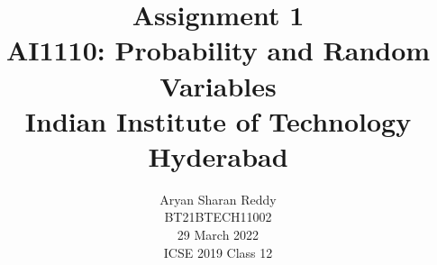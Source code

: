 \documentclass[journal,12pt,twocolumn]{IEEEtran}
\title{Assignment 1 \\ \Large AI1110: Probability and Random Variables \\ \large Indian Institute of Technology Hyderabad}
\author{Aryan Sharan Reddy \\ \normalsize BT21BTECH11002 \\ \vspace*{20pt} \normalsize  29 March 2022 \\ \vspace*{20pt} \Large ICSE 2019 Class 12}
\begin{document}
%


\newtheorem{theorem}{Theorem}[section]
\newtheorem{problem}{Problem}
\newtheorem{proposition}{Proposition}[section]
\newtheorem{lemma}{Lemma}[section]
\newtheorem{corollary}[theorem]{Corollary}
\newtheorem{example}{Example}[section]
\newtheorem{definition}[problem]{Definition}
\newcommand{\BEQA}{\begin{eqnarray}}
\newcommand{\EEQA}{\end{eqnarray}}
\newcommand{\define}{\stackrel{\triangle}{=}}
\newcommand*\circled[1]{\tikz[baseline=(char.base)]{
    \node[shape=circle,draw,inner sep=2pt] (char) {#1};}}

%
\providecommand{\mbf}{\mathbf}
\providecommand{\pr}[1]{\ensuremath{\Pr\left(#1\right)}}
\providecommand{\qfunc}[1]{\ensuremath{Q\left(#1\right)}}
\providecommand{\sbrak}[1]{\ensuremath{{}\left[#1\right]}}
\providecommand{\lsbrak}[1]{\ensuremath{{}\left[#1\right.}}
\providecommand{\rsbrak}[1]{\ensuremath{{}\left.#1\right]}}
\providecommand{\brak}[1]{\ensuremath{\left(#1\right)}}
\providecommand{\lbrak}[1]{\ensuremath{\left(#1\right.}}
\providecommand{\rbrak}[1]{\ensuremath{\left.#1\right)}}
\providecommand{\cbrak}[1]{\ensuremath{\left\{#1\right\}}}
\providecommand{\lcbrak}[1]{\ensuremath{\left\{#1\right.}}
\providecommand{\rcbrak}[1]{\ensuremath{\left.#1\right\}}}
\theoremstyle{remark}
\newtheorem{rem}{Remark}
\newcommand{\sgn}{\mathop{\mathrm{sgn}}}
\providecommand{\fourier}{\overset{\mathcal{F}}{ \rightleftharpoons}}
\providecommand{\system}{\overset{\mathcal{H}}{ \longleftrightarrow}}
\newcommand{\solution}{\noindent \textbf{Solution: }}
\newcommand{\cosec}{\,\text{cosec}\,}
\providecommand{\dec}[2]{\ensuremath{\overset{#1}{\underset{#2}{\gtrless}}}}
\newcommand{\myvec}[1]{\ensuremath{\begin{pmatrix}#1\end{pmatrix}}}
\newcommand{\mydet}[1]{\ensuremath{\begin{vmatrix}#1\end{vmatrix}}}
\makeatletter
{}
\makeatother
\let\StandardTheFigure\thefigure
\end{document}
